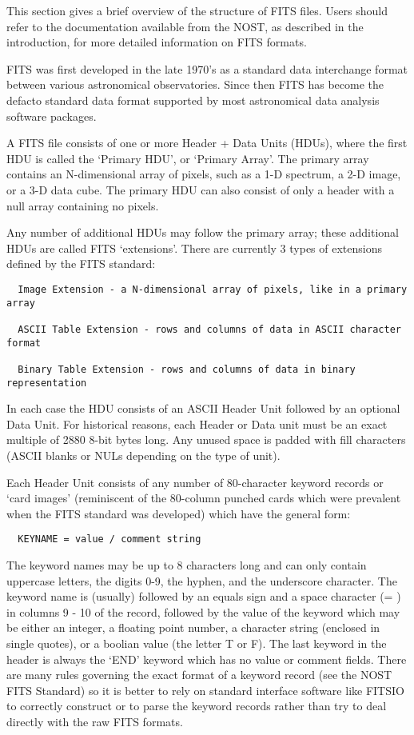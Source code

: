 This section gives a brief overview of the structure of FITS files.
Users should refer to the documentation available from the NOST, as
described in the introduction, for more detailed information on FITS
formats.

FITS was first developed in the late 1970's as a standard data
interchange format between various astronomical observatories.  Since
then FITS has become the defacto standard data format supported by most
astronomical data analysis software packages.

A FITS file consists of one or more Header + Data Units (HDUs), where
the first HDU is called the `Primary HDU', or `Primary Array'.  The
primary array contains an N-dimensional array of pixels, such as a 1-D
spectrum, a 2-D image, or a 3-D data cube.  The primary HDU can also
consist of only a header with a null array containing no pixels.

Any number of additional HDUs may follow the primary array; these
additional HDUs are called FITS `extensions'.  There are currently 3
types of extensions defined by the FITS standard:

\begin{verbatim}
  Image Extension - a N-dimensional array of pixels, like in a primary array

  ASCII Table Extension - rows and columns of data in ASCII character format

  Binary Table Extension - rows and columns of data in binary representation
\end{verbatim}
In each case the HDU consists of an ASCII Header Unit followed by an optional
Data Unit.  For historical reasons, each Header or Data unit must be an
exact multiple of 2880 8-bit bytes long.  Any unused space is padded
with fill characters (ASCII blanks or NULs depending on the type of unit).

Each Header Unit consists of any number of 80-character keyword records
or `card images' (reminiscent of the 80-column punched cards which
were prevalent when the FITS standard was developed) which have the
general form:

\begin{verbatim}
  KEYNAME = value / comment string
\end{verbatim}
The keyword names may be up to 8 characters long and can only contain
uppercase letters, the digits 0-9, the hyphen, and the underscore
character. The keyword name is (usually) followed by an equals sign and
a space character (= ) in columns 9 - 10 of the record, followed by the
value of the keyword which may be either an integer, a floating point
number, a character string (enclosed in single quotes), or a boolian
value (the letter T or F). The last keyword in the header is always the
`END' keyword which has no value or comment fields. There are many
rules governing the exact format of a keyword record (see the NOST FITS
Standard) so it is better to rely on standard interface software like
FITSIO to correctly construct or to parse the keyword records rather
than try to deal directly with the raw FITS formats.

